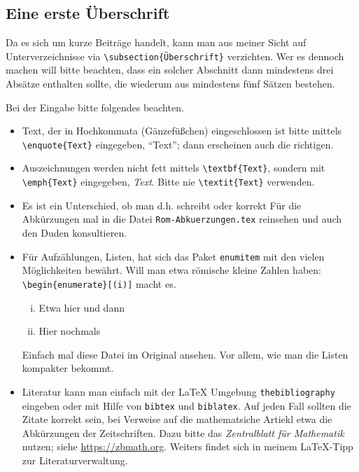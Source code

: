 \begin{refsection}

\section*{Eine erste Überschrift}
% 
Da es sich um kurze Beiträge handelt, kann man aus meiner Sicht auf Unterverzeichnisse via
\verb|\subsection{Überschrift}| verzichten.
Wer es dennoch machen will bitte beachten, dass ein solcher Abschnitt dann mindestens drei Absätze enthalten sollte, die wiederum aus mindestens fünf Sätzen bestehen.

Bei der Eingabe bitte folgendes beachten.

\begin{itemize}[nosep, topsep=1em]
\item
Text, der in Hochkommata (Gänzefüßchen) eingeschlossen ist bitte mittels \verb|\enquote{Text}|
eingegeben, \dh \enquote{Text}; dann erscheinen auch die richtigen.

\item
Auszeichnungen werden nicht fett mittels \verb|\textbf{Text}|, sondern mit \verb|\emph{Text}|
eingegeben, \dh \emph{Text}.
Bitte nie \verb|\textit{Text}| verwenden.

\item
Es ist ein Unterschied, ob man d.h. schreibt oder korrekt \dh
Für die Abkürzungen mal in die Datei \texttt{Rom-Abkuerzungen.tex} reinsehen und auch den Duden konsultieren.

\item
Für Aufzählungen, \dh Listen, hat sich das Paket \texttt{enumitem} mit den vielen Möglichkeiten bewährt.
Will man etwa römische kleine Zahlen haben: \verb|\begin{enumerate}[(i)]| macht es.

\begin{enumerate}[(i), nosep]
\item
Etwa hier und dann
\item
Hier nochmals
\end{enumerate}

Einfach mal diese Datei im Original ansehen.
Vor allem, wie man die Listen kompakter bekommt.

\item
Literatur kann man einfach mit der \LaTeX{} Umgebung \texttt{thebibliography} eingeben oder mit Hilfe von  \texttt{bibtex} und \texttt{biblatex}.
Auf jeden Fall sollten die Zitate korrekt sein, \dh bei Verweise auf die mathematsiche Artiekl etwa die Abkürzungen der Zeitschriften.
Dazu bitte das \emph{Zentralblatt für Mathematik} nutzen; siehe \href{https://zbmath.org}{https://zbmath.org}.
Weiters findet sich in meinem \LaTeX-Tipp zur Literaturverwaltung. 


\end{itemize}
\end{refsection}
